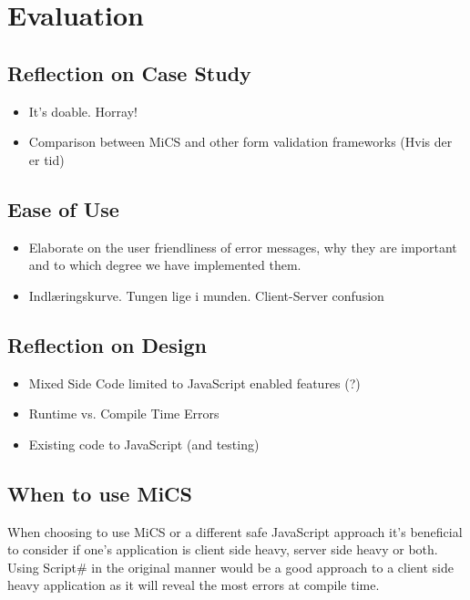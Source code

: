 \chapter{Evaluation}

\section{Reflection on Case Study} %
\label{sec:reflection_on_case_study}
	\begin{itemize}
		\item It's doable. Horray!
		\item Comparison between MiCS and other form validation frameworks (Hvis der er tid)
	\end{itemize}

\section{Ease of Use} %
\label{sec:ease_of_use}

	\begin{itemize}
		\item Elaborate on the user friendliness of error messages, why they are important
		and to which degree we have implemented them.
		\item Indlæringskurve. Tungen lige i munden. Client-Server confusion
	\end{itemize}


\section{Reflection on Design} %
\label{sec:reflection_on_design_goals}
	\begin{itemize}
		\item Mixed Side Code limited to JavaScript enabled features (?)
		\item Runtime vs. Compile Time Errors
		\item Existing code to JavaScript (and testing)
	\end{itemize}


\section{When to use MiCS} %
\label{sec:when_to_use_mics}
	When choosing to use MiCS or a different safe JavaScript approach it’s beneficial to consider if one’s application is client side heavy, server side heavy or both. Using Script\# in the original manner would be a good approach to a client side heavy application as it will reveal the most errors at compile time. 

